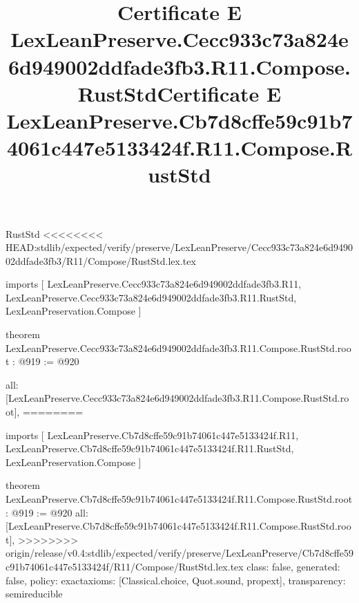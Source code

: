 \begin{lexlean}{RustStd}
<<<<<<<< HEAD:stdlib/expected/verify/preserve/LexLeanPreserve/Cecc933c73a824e6d949002ddfade3fb3/R11/Compose/RustStd.lex.tex
\title{Certificate E LexLeanPreserve.Cecc933c73a824e6d949002ddfade3fb3.R11.Compose.RustStd}
\begin{coremodule}
imports [
  LexLeanPreserve.Cecc933c73a824e6d949002ddfade3fb3.R11,
  LexLeanPreserve.Cecc933c73a824e6d949002ddfade3fb3.R11.RustStd,
  LexLeanPreservation.Compose
]

theorem LexLeanPreserve.Cecc933c73a824e6d949002ddfade3fb3.R11.Compose.RustStd.root : @919 := @920 {
  all: [LexLeanPreserve.Cecc933c73a824e6d949002ddfade3fb3.R11.Compose.RustStd.root],
========
\title{Certificate E LexLeanPreserve.Cb7d8cffe59c91b74061c447e5133424f.R11.Compose.RustStd}
\begin{coremodule}
imports [
  LexLeanPreserve.Cb7d8cffe59c91b74061c447e5133424f.R11,
  LexLeanPreserve.Cb7d8cffe59c91b74061c447e5133424f.R11.RustStd,
  LexLeanPreservation.Compose
]

theorem LexLeanPreserve.Cb7d8cffe59c91b74061c447e5133424f.R11.Compose.RustStd.root : @919 := @920 {
  all: [LexLeanPreserve.Cb7d8cffe59c91b74061c447e5133424f.R11.Compose.RustStd.root],
>>>>>>>> origin/release/v0.4:stdlib/expected/verify/preserve/LexLeanPreserve/Cb7d8cffe59c91b74061c447e5133424f/R11/Compose/RustStd.lex.tex
  class: false,
  generated: false,
  policy: exact{axioms: [Classical.choice, Quot.sound, propext]},
  transparency: semireducible
}


\end{coremodule}}
\end{coremodule}
\end{lexlean}
